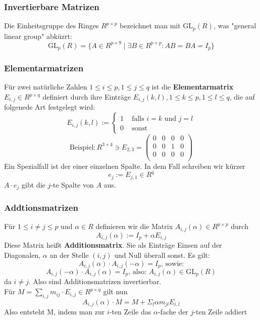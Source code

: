 \documentclass{kit}
\begin{document}
    \subsubsection{Invertierbare Matrizen}
      Die Einheitsgruppe des Ringes $R^{p\times p}$ bezeichnet man mit $\text{GL}_p(R)$, was "general linear group" abküzrt:
      $$\text{GL}_p(R)=\{A\in R^{p\times 9}\mid\exists B\in R^{p\times p}:AB=BA=I_p\}$$
    \subsubsection{Elementarmatrizen}
      Für zwei natürliche Zahlen $1\le i\le p,1\le j\le q$ ist die \textbf{Elementarmatrix} $E_{i,j}\in R^{p\times q}$ definiert durch ihre Einträge $E_{i,j}(k,l),1\le k\le p,1\le l\le q$, die auf folgenede Art festgelegt wird:
      $$E_{i,j}(k,l):=\begin{cases}
        1 & \text{ falls }i=k\text{ und }j=l\\
        0 & \text{ sonst}
      \end{cases}$$
      $$\text{Beispiel}:R^{3\times 4}\ni E_{2,3}=\begin{pmatrix}
        0 & 0 & 0 & 0\\
        0 & 0 & 1 & 0\\
        0 & 0 & 0 & 0\\
      \end{pmatrix}$$
      Ein Spezialfall ist der einer einzelnen Spalte. In dem Fall schreiben wir kürzer
      $$e_j:=E_{j,1}\in R^q$$
      $A\cdot e_j$ gibt die $j$-te Spalte von $A$ aus.
    \subsubsection{Addtionsmatrizen}
      Für $1\le i\neq j\le p$ und $\alpha\in R$ definieren wir die Matrix $A_{i,j}(\alpha)\in R^{p\times p}$ durch
      $$A_{i,j}(\alpha):=I_p+\alpha E_{i,j}$$
      Diese Matrix heißt \textbf{Additionsmatrix}. Sie als Einträge Einsen auf der Diagonalen, $\alpha$ an der Stelle $(i,j)$ und Null überall sonst. Es gilt:
      $$A_{i,j}(\alpha)\cdot A_{i,j}(-\alpha)=I_p\text{, sowie:}$$
      $$A_{i,j}(-\alpha)\cdot A_{i,j}(\alpha)=I_p\text{, also: } A_{i,j}(\alpha)\in \text{GL}_p(R)$$
      da $i\neq j$. Also sind Additionsmatrizen invertierbar.\\
      Für $M=\sum_{i,j}m_{ij}\cdot E_{i,j}\in R^{p\times q}$ gilt nun
      $$A_{i,j}(\alpha)\cdot M=M+\Sigma_l\alpha m_{jl}E_{i,l}$$
      Also entsteht M, indem man zur $i$-ten Zeile das $\alpha$-fache der $j$-ten Zeile addiert
\end{document}
